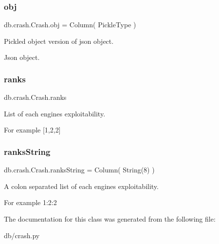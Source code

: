 \subsubsection{\texorpdfstring{obj}{obj}}
{\footnotesize\ttfamily db.\+crash.\+Crash.\+obj = Column( Pickle\+Type )\hspace{0.3cm}{\ttfamily [static]}}



Pickled object version of json object. 

Json object. \mbox{\label{classdb_1_1crash_1_1_crash_a0520e8dbb9d3f721df764f8e1fecaf8b}} 
\subsubsection{\texorpdfstring{ranks}{ranks}}
{\footnotesize\ttfamily db.\+crash.\+Crash.\+ranks}



List of each engines exploitability. 

For example \mbox{[}1,2,2\mbox{]} \mbox{\label{classdb_1_1crash_1_1_crash_ac2d5ddf37844b111c5e437b1fcbefbca}} 
\subsubsection{\texorpdfstring{ranks\+String}{ranksString}}
{\footnotesize\ttfamily db.\+crash.\+Crash.\+ranks\+String = Column( String(8) )\hspace{0.3cm}{\ttfamily [static]}}



A colon separated list of each engines exploitability. 

For example 1\+:2\+:2 

The documentation for this class was generated from the following file\+:\begin{DoxyCompactItemize}
\item 
db/crash.\+py\end{DoxyCompactItemize}
